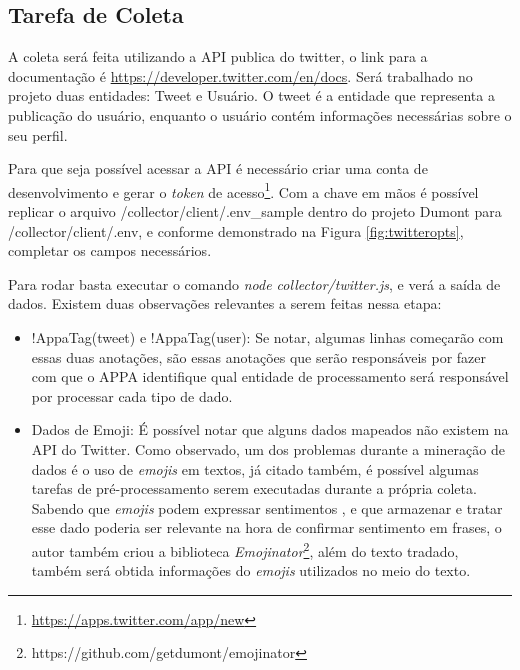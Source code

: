 \subsection{Tarefa de Coleta}
A coleta será feita utilizando a API publica do twitter, o link para a documentação é \url{https://developer.twitter.com/en/docs}. Será trabalhado no projeto duas entidades: Tweet e Usuário. O tweet é a entidade que representa a publicação do usuário, enquanto o usuário contém informações necessárias sobre o seu perfil.

Para que seja possível acessar a API é necessário criar uma conta de desenvolvimento e gerar o \textit{token} de acesso\footnote{\url{https://apps.twitter.com/app/new}}. Com a chave em mãos é possível replicar o arquivo /collector/client/.env\_sample dentro do projeto Dumont para /collector/client/.env, e conforme demonstrado na Figura \ref{fig:twitteropts}, completar os campos necessários.

Para rodar basta executar o comando \textit{node collector/twitter.js}, e verá a saída de dados. Existem duas observações relevantes a serem feitas nessa etapa:
\begin{itemize}
  \item !AppaTag(tweet) e !AppaTag(user): Se notar, algumas linhas começarão com essas duas anotações, são essas anotações que serão responsáveis por fazer com que o APPA identifique qual entidade de processamento será responsável por processar cada tipo de dado.
  \item Dados de Emoji: É possível notar que alguns dados mapeados não existem na API do Twitter. Como observado, um dos problemas durante a mineração de dados é o uso de \textit{emojis} em textos, já citado também, é possível algumas tarefas de pré-processamento serem executadas durante a própria coleta. Sabendo que \textit{emojis} podem expressar sentimentos \cite{novak2015sentiment}, e que armazenar e tratar esse dado poderia ser relevante na hora de confirmar sentimento em frases, o autor também criou a biblioteca \textit{Emojinator}\footnote{https://github.com/getdumont/emojinator}, além do texto tradado, também será obtida informações do \textit{emojis} utilizados no meio do texto.
\end{itemize}

